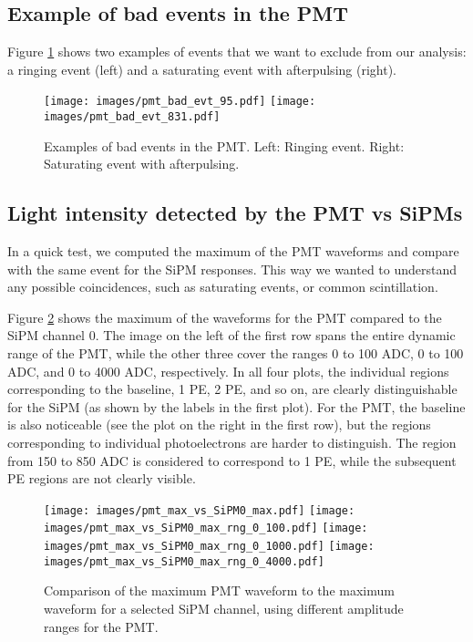 \documentclass[11pt,a4paper,english,oneside, pdf]{article}
\begin{document}
	\subsection{Example of bad events in the PMT}
	
	Figure \ref{fig:pmt_bad_evts} shows two examples of events that we want to exclude from our analysis: a ringing event (left) and a saturating event with afterpulsing (right).
	
	
	\begin{figure}[!h]
		\begin{center}
			\texttt{[image: images/pmt\_bad\_evt\_95.pdf]}
			\texttt{[image: images/pmt\_bad\_evt\_831.pdf]}
			\caption{Examples of bad events in the PMT. Left: Ringing event. Right: Saturating event with afterpulsing.}
			\label{fig:pmt_bad_evts}
		\end{center}
	\end{figure}
	
	
	\subsection{Light intensity detected by the PMT vs SiPMs}
	
	In a quick test, we computed the maximum of the PMT waveforms and compare with the same event for the SiPM responses. This way we wanted to understand any possible coincidences, such as saturating events, or common scintillation.
	
	Figure \ref{fig:pmt_and_sipm_max} shows the maximum of the waveforms for the PMT compared to the SiPM channel 0. The image on the left of the first row spans the entire dynamic range of the PMT, while the other three cover the ranges 0 to 100 ADC, 0 to 100 ADC, and 0 to 4000 ADC, respectively. In all four plots, the individual regions corresponding to the baseline, 1 PE, 2 PE, and so on, are clearly distinguishable for the SiPM (as shown by the labels in the first plot). For the PMT, the baseline is also noticeable (see the plot on the right in the first row), but the regions corresponding to individual photoelectrons are harder to distinguish. The region from 150 to 850 ADC is considered to correspond to 1 PE, while the subsequent PE regions are not clearly visible.
	
	\begin{figure}[!h]
		\begin{center}
			\texttt{[image: images/pmt\_max\_vs\_SiPM0\_max.pdf]}
			\texttt{[image: images/pmt\_max\_vs\_SiPM0\_max\_rng\_0\_100.pdf]}
			\texttt{[image: images/pmt\_max\_vs\_SiPM0\_max\_rng\_0\_1000.pdf]}
			\texttt{[image: images/pmt\_max\_vs\_SiPM0\_max\_rng\_0\_4000.pdf]}
			\caption{Comparison of the maximum PMT waveform to the maximum waveform for a selected SiPM channel, using different amplitude ranges for the PMT.}
			\label{fig:pmt_and_sipm_max}
		\end{center}
	\end{figure}
	
\end{document}
